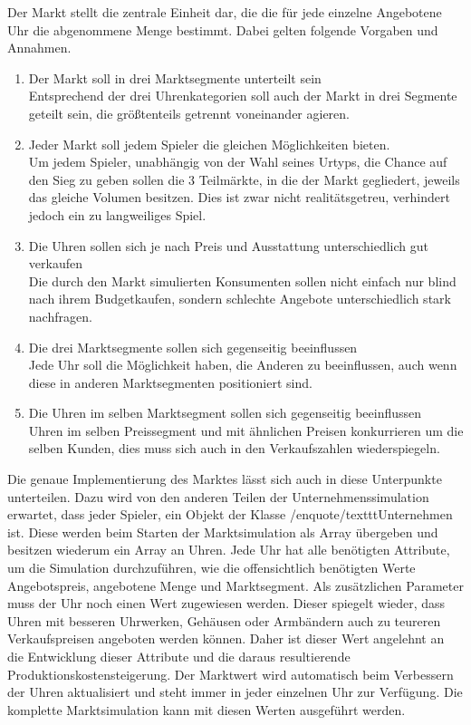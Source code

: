 Der Markt stellt die zentrale Einheit dar, die die für jede einzelne Angebotene Uhr die abgenommene Menge bestimmt. Dabei gelten folgende Vorgaben und Annahmen.
\begin{enumerate}
\item Der Markt soll in drei Marktsegmente unterteilt sein
	\\ Entsprechend der drei Uhrenkategorien soll auch der Markt in drei Segmente geteilt sein, die größtenteils getrennt voneinander agieren.
\item Jeder Markt soll jedem Spieler die gleichen Möglichkeiten bieten.
	\\ Um jedem Spieler, unabhängig von der Wahl seines Urtyps, die Chance auf den Sieg zu geben sollen die 3 Teilmärkte, in die der Markt gegliedert, jeweils das gleiche Volumen besitzen. Dies ist zwar nicht realitätsgetreu, verhindert jedoch ein zu langweiliges Spiel.
\item Die Uhren sollen sich je nach Preis und Ausstattung unterschiedlich gut verkaufen
	\\ Die durch den Markt simulierten Konsumenten sollen nicht einfach nur blind nach ihrem Budgetkaufen, sondern schlechte Angebote unterschiedlich stark nachfragen.
\item Die drei Marktsegmente sollen sich gegenseitig beeinflussen
	\\ Jede Uhr soll die Möglichkeit haben, die Anderen zu beeinflussen, auch wenn diese in anderen Marktsegmenten positioniert sind.
\item Die Uhren im selben Marktsegment sollen sich gegenseitig beeinflussen
	\\ Uhren im selben Preissegment und mit ähnlichen Preisen konkurrieren um die selben Kunden, dies muss sich auch in den Verkaufszahlen wiederspiegeln.
\end{enumerate}

Die genaue Implementierung des Marktes lässt sich auch in diese Unterpunkte unterteilen. Dazu wird von den anderen Teilen der Unternehmenssimulation erwartet, dass jeder Spieler, ein Objekt der Klasse /enquote{/texttt{Unternehmen}} ist. Diese werden beim Starten der Marktsimulation als Array übergeben und besitzen wiederum ein Array an Uhren. Jede Uhr hat alle benötigten Attribute, um die Simulation durchzuführen, wie die offensichtlich benötigten Werte Angebotspreis, angebotene Menge und Marktsegment. Als zusätzlichen Parameter muss der Uhr noch einen Wert zugewiesen werden. Dieser spiegelt wieder, dass Uhren mit besseren Uhrwerken, Gehäusen oder Armbändern auch zu teureren Verkaufspreisen angeboten werden können. Daher ist dieser Wert angelehnt an die Entwicklung dieser Attribute und die daraus resultierende Produktionskostensteigerung. Der Marktwert wird automatisch beim Verbessern der Uhren aktualisiert und steht immer in jeder einzelnen Uhr zur Verfügung. Die komplette Marktsimulation kann mit diesen Werten ausgeführt werden.

